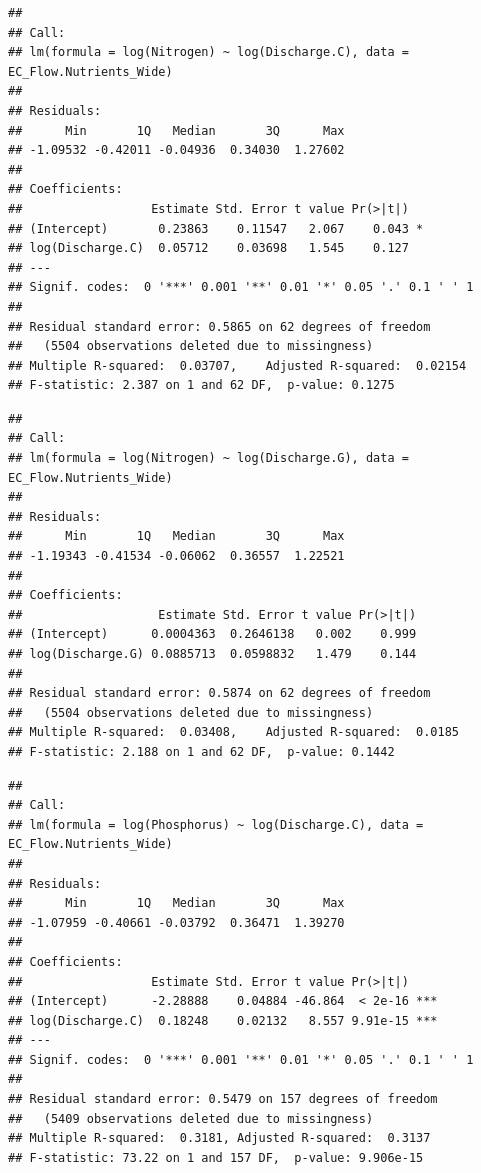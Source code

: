 \documentclass[12pt,]{article}
\begin{document}
\begin{verbatim}
## 
## Call:
## lm(formula = log(Nitrogen) ~ log(Discharge.C), data = EC_Flow.Nutrients_Wide)
## 
## Residuals:
##      Min       1Q   Median       3Q      Max 
## -1.09532 -0.42011 -0.04936  0.34030  1.27602 
## 
## Coefficients:
##                  Estimate Std. Error t value Pr(>|t|)  
## (Intercept)       0.23863    0.11547   2.067    0.043 *
## log(Discharge.C)  0.05712    0.03698   1.545    0.127  
## ---
## Signif. codes:  0 '***' 0.001 '**' 0.01 '*' 0.05 '.' 0.1 ' ' 1
## 
## Residual standard error: 0.5865 on 62 degrees of freedom
##   (5504 observations deleted due to missingness)
## Multiple R-squared:  0.03707,    Adjusted R-squared:  0.02154 
## F-statistic: 2.387 on 1 and 62 DF,  p-value: 0.1275
\end{verbatim}

\begin{verbatim}
## 
## Call:
## lm(formula = log(Nitrogen) ~ log(Discharge.G), data = EC_Flow.Nutrients_Wide)
## 
## Residuals:
##      Min       1Q   Median       3Q      Max 
## -1.19343 -0.41534 -0.06062  0.36557  1.22521 
## 
## Coefficients:
##                   Estimate Std. Error t value Pr(>|t|)
## (Intercept)      0.0004363  0.2646138   0.002    0.999
## log(Discharge.G) 0.0885713  0.0598832   1.479    0.144
## 
## Residual standard error: 0.5874 on 62 degrees of freedom
##   (5504 observations deleted due to missingness)
## Multiple R-squared:  0.03408,    Adjusted R-squared:  0.0185 
## F-statistic: 2.188 on 1 and 62 DF,  p-value: 0.1442
\end{verbatim}

\begin{verbatim}
## 
## Call:
## lm(formula = log(Phosphorus) ~ log(Discharge.C), data = EC_Flow.Nutrients_Wide)
## 
## Residuals:
##      Min       1Q   Median       3Q      Max 
## -1.07959 -0.40661 -0.03792  0.36471  1.39270 
## 
## Coefficients:
##                  Estimate Std. Error t value Pr(>|t|)    
## (Intercept)      -2.28888    0.04884 -46.864  < 2e-16 ***
## log(Discharge.C)  0.18248    0.02132   8.557 9.91e-15 ***
## ---
## Signif. codes:  0 '***' 0.001 '**' 0.01 '*' 0.05 '.' 0.1 ' ' 1
## 
## Residual standard error: 0.5479 on 157 degrees of freedom
##   (5409 observations deleted due to missingness)
## Multiple R-squared:  0.3181, Adjusted R-squared:  0.3137 
## F-statistic: 73.22 on 1 and 157 DF,  p-value: 9.906e-15
\end{verbatim}
\end{document}
